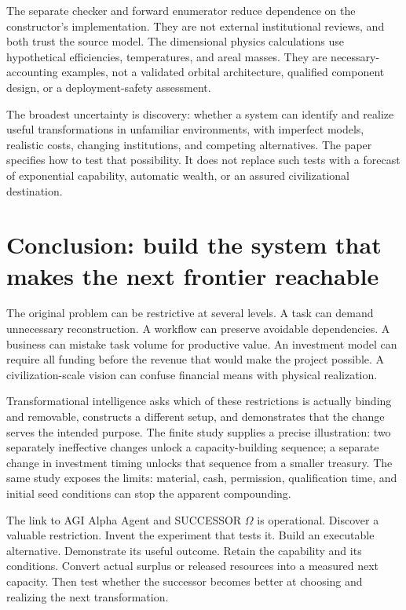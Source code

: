 \documentclass[11pt,letterpaper]{article}
\newcommand{\1}{\mathbf 1}
\theoremstyle{remark}\newtheorem{remark}{Remark}[section]
\begin{document}
The separate checker and forward enumerator reduce dependence on the constructor's implementation. They are not external institutional reviews, and both trust the source model. The dimensional physics calculations use hypothetical efficiencies, temperatures, and areal masses. They are necessary-accounting examples, not a validated orbital architecture, qualified component design, or a deployment-safety assessment.

The broadest uncertainty is discovery: whether a system can identify and realize useful transformations in unfamiliar environments, with imperfect models, realistic costs, changing institutions, and competing alternatives. The paper specifies how to test that possibility. It does not replace such tests with a forecast of exponential capability, automatic wealth, or an assured civilizational destination.

\section{Conclusion: build the system that makes the next frontier reachable}
The original problem can be restrictive at several levels. A task can demand unnecessary reconstruction. A workflow can preserve avoidable dependencies. A business can mistake task volume for productive value. An investment model can require all funding before the revenue that would make the project possible. A civilization-scale vision can confuse financial means with physical realization.

Transformational intelligence asks which of these restrictions is actually binding and removable, constructs a different setup, and demonstrates that the change serves the intended purpose. The finite study supplies a precise illustration: two separately ineffective changes unlock a capacity-building sequence; a separate change in investment timing unlocks that sequence from a smaller treasury. The same study exposes the limits: material, cash, permission, qualification time, and initial seed conditions can stop the apparent compounding.

The link to AGI Alpha Agent and SUCCESSOR $\Omega$ is operational. Discover a valuable restriction. Invent the experiment that tests it. Build an executable alternative. Demonstrate its useful outcome. Retain the capability and its conditions. Convert actual surplus or released resources into a measured next capacity. Then test whether the successor becomes better at choosing and realizing the next transformation.
\end{document}

